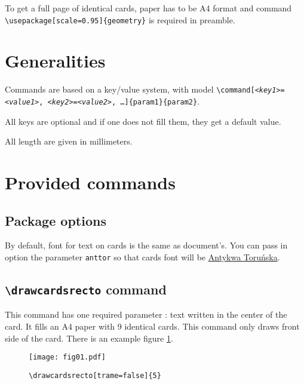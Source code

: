 \documentclass[a4paper, 12pt]{article}
\newcommand{\kv}[2]{\textit{<#1>}\texttt=\textit{<#2>}}
\newcommand{\commande}[1]{\texttt{\textbackslash#1}}
\begin{document}
To get a full page of identical cards, paper has to be A4 format and command \commande{usepackage[scale=0.95]\{geometry\}} is required in preamble.

\section{Generalities}
Commands are based on a key/value system, with model \texttt{\textbackslash command[\kv{key1}{value1}, \kv{key2}{value2}, …]\{param1\}\{param2\}}.

All keys are optional and if one does not fill them, they get a default value.

All length are given in millimeters.

\section{Provided commands}
	\subsection{Package options}
By default, font for text on cards is the same as document's. You can pass in option the parameter \texttt{anttor} so that cards font will be \href{https://tug.org/FontCatalogue/antykwatorunska/}{Antykwa Toruńska}.

	\subsection{\commande{drawcardsrecto} command}
This command has one required parameter : text written in the center of the card. It fills an A4 paper with 9 identical cards. This command only draws front side of the card. There is an example figure \ref{fig:recto}.
\begin{figure}[h]\begin{center}
	\caption{\commande{drawcardsrecto[trame=false]\{5\}}}
	\texttt{[image: fig01.pdf]}\label{fig:recto}
\end{center}\end{figure}
\end{document}
